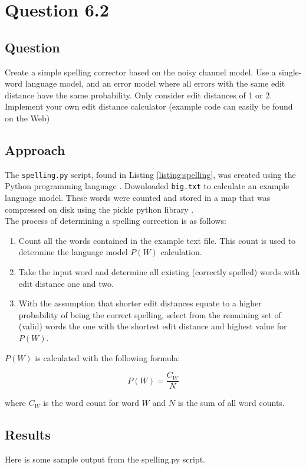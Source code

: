 \section{Question 6.2}

\subsection{Question}
Create a simple spelling corrector based on the noisy channel model. Use a
single-word language model, and an error model where all errors with the same
edit distance have the same probability. Only consider edit distances of 1 or 2.
Implement your own edit distance calculator (example code can easily be found
on the Web)

\subsection{Approach}
The \texttt{spelling.py} script, found in Listing \ref{listing:spelling}, was created using the Python programming language \cite{python}.  Downloaded \texttt{big.txt} to calculate an example language model.  These words were counted and stored in a map that was compressed on disk using the pickle python library \cite{py:pickle}.\\

The process of determining a spelling correction is as follows:

\begin{enumerate}
    \item Count all the words contained in the example text file.  This count is used to determine the language model \(P(W)\) calculation.
    \item Take the input word and determine all existing (correctly spelled) words with edit distance one and two.
    \item With the assumption that shorter edit distances equate to a higher probability of being the correct spelling, select from the remaining set of (valid) words the one with the shortest edit distance and highest value for \(P(W)\).
\end{enumerate}

\(P(W)\) is calculated with the following formula:

\[P(W) = \frac{C_W}{N}\]

where \(C_W\) is the word count for word \(W\) and \(N\) is the sum of all word counts.

\subsection{Results}
Here is some sample output from the spelling.py script.


